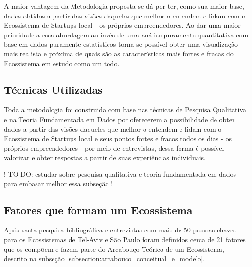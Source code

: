 A maior vantagem da Metodologia proposta se dá por ter, como sua maior base, dados obtidos a partir das visões daqueles que melhor o entendem e lidam com o Ecossistema de Startups local - os próprios empreendedores. Ao dar uma maior prioridade a essa abordagem ao invés de uma análise puramente quantitativa com base em dados puramente estatísticos torna-se possível obter uma visualização mais realista e próxima de quais são as características mais fortes e fracas do Ecossistema em estudo como um todo.

\subsection{Técnicas Utilizadas}
\label{subsection:tecnicas_utilizadas}

Toda a metodologia foi construida com base nas técnicas de Pesquisa Qualitativa e na Teoria Fundamentada em Dados por oferecerem a possibilidade de obter dados a partir das visões daqueles que melhor o entendem e lidam com o Ecossistema de Startups local e seus pontos fortes e fracos todos os dias - os próprios empreendedores - por meio de entrevistas, dessa forma é possível valorizar e obter respostas a partir de suas experiências individuais.

! TO-DO: estudar sobre pesquisa qualitativa e teoria fundamentada em dados para embasar melhor essa subseção !

\subsection{Fatores que formam um Ecossistema}
\label{subsection:fatores_que_formam_um_ecossistema}

Após vasta pesquisa bibliográfica e entrevistas com mais de 50 pessoas chaves para os Ecossistemas de Tel-Aviv e São Paulo foram definidos cerca de 21 fatores que os compõem e fazem parte do Arcabouço Teórico de um Ecossistema, descrito na subseção \ref{subsection:arcabouco_conceitual_e_modelo}. 

